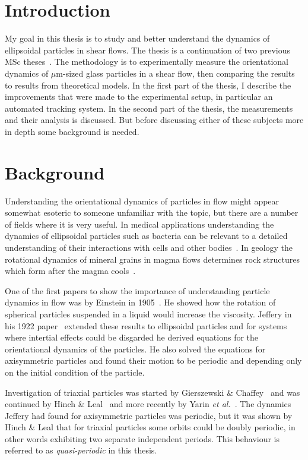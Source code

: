 \section{Introduction}
My goal in this thesis is to study and better understand the dynamics of ellipsoidal particles in shear flows. The thesis is a continuation of two previous MSc theses~\cite{AntonThesis, JonasThesis}. The methodology is to experimentally measure the orientational dynamics of $\mu$m-sized glass particles in a shear flow, then comparing the results to results from theoretical models. In the first part of the thesis, I describe the improvements that were made to the experimental setup, in particular an automated tracking system. In the second part of the thesis, the measurements and their analysis is discussed. But before discussing either of these subjects more in depth some background is needed.

\section{Background}
Understanding the orientational dynamics of particles in flow might appear somewhat esoteric to someone unfamiliar with the topic, but there are a number of fields where it is very useful. In medical applications understanding the dynamics of ellipsoidal particles such as bacteria can be relevant to a detailed understanding of their interactions with cells and other bodies~\cite{Tolga}. In geology the rotational dynamics of mineral grains in magma flows determines rock structures which form after the magma cools~\cite{geology}.

One of the first papers to show the importance of understanding particle dynamics in flow was by Einstein in 1905~\cite{Einstein}. He showed how the rotation of spherical particles suspended in a liquid would increase the viscosity. Jeffery in his 1922 paper~\cite{Jeffery} extended these results to ellipsoidal  particles and for systems where intertial effects could be disgarded he derived equations for the orientational dynamics of the particles. He also solved the equations for axisymmetric particles and found their motion to be periodic and depending only on the initial condition of the particle. 

Investigation of triaxial particles was started by Gierszewski \& Chaffey~\cite{Chaffey} and was continued by Hinch \& Leal~\cite{Leal} and more recently by Yarin \emph{et al.}~\cite{Yarin}. 
The dynamics Jeffery had found for axisymmetric particles was periodic, but it was shown by Hinch \& Leal that for triaxial particles some orbits could be doubly periodic, in other words exhibiting two separate independent periods. This behaviour is referred to as \emph{quasi-periodic} in this thesis.

